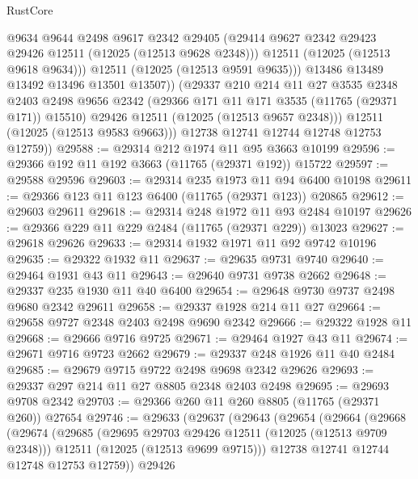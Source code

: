 \begin{lexlean}{RustCore}
\begin{coremodule}
                  @9634
                  @9644
                  @2498
                  @9617
                  @2342
                  @29405
                  (@29414 @9627 @2342 @29423 @29426 @12511 (@12025 (@12513 @9628 @2348)))
                  @12511
                  (@12025 (@12513 @9618 @9634)))
                @12511
                (@12025 (@12513 @9591 @9635)))
              @13486
              @13489
              @13492
              @13496
              @13501
              @13507))
          (@29337
            @210
            @214
            @11
            @27
            @3535
            @2348
            @2403
            @2498
            @9656
            @2342
            (@29366 @171 @11 @171 @3535 (@11765 (@29371 @171)) @15510)
            @29426
            @12511
            (@12025 (@12513 @9657 @2348)))
          @12511
          (@12025 (@12513 @9583 @9663)))
        @12738
        @12741
        @12744
        @12748
        @12753
        @12759))
@29588 := @29314 @212 @1974 @11 @95 @3663 @10199
@29596 := @29366 @192 @11 @192 @3663 (@11765 (@29371 @192)) @15722
@29597 := @29588 @29596
@29603 := @29314 @235 @1973 @11 @94 @6400 @10198
@29611 := @29366 @123 @11 @123 @6400 (@11765 (@29371 @123)) @20865
@29612 := @29603 @29611
@29618 := @29314 @248 @1972 @11 @93 @2484 @10197
@29626 := @29366 @229 @11 @229 @2484 (@11765 (@29371 @229)) @13023
@29627 := @29618 @29626
@29633 := @29314 @1932 @1971 @11 @92 @9742 @10196
@29635 := @29322 @1932 @11
@29637 := @29635 @9731 @9740
@29640 := @29464 @1931 @43 @11
@29643 := @29640 @9731 @9738 @2662
@29648 := @29337 @235 @1930 @11 @40 @6400
@29654 := @29648 @9730 @9737 @2498 @9680 @2342 @29611
@29658 := @29337 @1928 @214 @11 @27
@29664 := @29658 @9727 @2348 @2403 @2498 @9690 @2342
@29666 := @29322 @1928 @11
@29668 := @29666 @9716 @9725
@29671 := @29464 @1927 @43 @11
@29674 := @29671 @9716 @9723 @2662
@29679 := @29337 @248 @1926 @11 @40 @2484
@29685 := @29679 @9715 @9722 @2498 @9698 @2342 @29626
@29693 := @29337 @297 @214 @11 @27 @8805 @2348 @2403 @2498
@29695 := @29693 @9708 @2342
@29703 := @29366 @260 @11 @260 @8805 (@11765 (@29371 @260)) @27654
@29746 := @29633
    (@29637
      (@29643
        (@29654
          (@29664
            (@29668
              (@29674
                (@29685
                  (@29695 @29703 @29426 @12511 (@12025 (@12513 @9709 @2348)))
                  @12511
                  (@12025 (@12513 @9699 @9715)))
                @12738
                @12741
                @12744
                @12748
                @12753
                @12759))
            @29426

\end{coremodule}
\end{lexlean}
